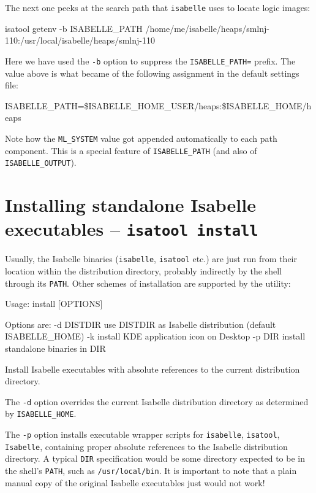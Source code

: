 The next one peeks at the search path that \texttt{isabelle} uses to
locate logic images:
\begin{ttbox}
isatool getenv -b ISABELLE_PATH
{\out /home/me/isabelle/heaps/smlnj-110:/usr/local/isabelle/heaps/smlnj-110}
\end{ttbox}
Here we have used the \texttt{-b} option to suppress the
\texttt{ISABELLE_PATH=} prefix.  The value above is what became of the
following assignment in the default settings file:
\begin{ttbox}
ISABELLE_PATH=\$ISABELLE_HOME_USER/heaps:\$ISABELLE_HOME/heaps
\end{ttbox}
Note how the \texttt{ML_SYSTEM} value got appended automatically to
each path component. This is a special feature of
\texttt{ISABELLE_PATH} (and also of \texttt{ISABELLE_OUTPUT}).


\section{Installing standalone Isabelle executables -- \texttt{isatool install}}

Usually, the Isabelle binaries (\texttt{isabelle}, \texttt{isatool} etc.) are
just run from their location within the distribution directory, probably
indirectly by the shell through its \texttt{PATH}.  Other schemes of
installation are supported by the  utility:
\begin{ttbox}
Usage: install [OPTIONS]

  Options are:
    -d DISTDIR   use DISTDIR as Isabelle distribution (default ISABELLE_HOME)
    -k           install KDE application icon on Desktop
    -p DIR       install standalone binaries in DIR

  Install Isabelle executables with absolute references to the current
  distribution directory.
\end{ttbox}

The \texttt{-d} option overrides the current Isabelle distribution directory
as determined by \texttt{ISABELLE_HOME}.

The \texttt{-p} option installs executable wrapper scripts for
\texttt{isabelle}, \texttt{isatool}, \texttt{Isabelle}, containing proper
absolute references to the Isabelle distribution directory.  A typical
\texttt{DIR} specification would be some directory expected to be in the
shell's \texttt{PATH}, such as \texttt{/usr/local/bin}.  It is important to
note that a plain manual copy of the original Isabelle executables just would
not work!

